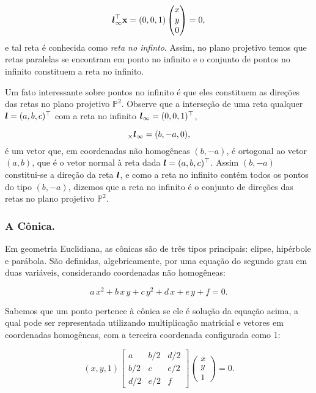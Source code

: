 \begin{equation*}
\boldsymbol{l}_\infty^\top \mathbf{x}=(0,0,1)
\begin{pmatrix}
x\\
y\\
0
\end{pmatrix}
=0,
\end{equation*} 
e tal reta é conhecida como \textit{reta no infinto}. Assim, no plano projetivo temos que retas paralelas se encontram em ponto no infinito e o conjunto de pontos no infinito constituem a reta no infinito.

Um fato interessante sobre pontos no infinito é que eles constituem as direções das retas no plano projetivo $\mathbb{P}^2$. Observe que a interseção de uma reta qualquer $\boldsymbol{l}=(a,b,c)^\top$ com a reta no infinito $\boldsymbol{l}_\infty=(0,0,1)^\top$,

\begin{equation*}
[\lightrgb]_\times \lightrgb_\infty=(b,-a,0),
\end{equation*}
é um vetor que, em coordenadas não homogêneas $(b,-a)$, é ortogonal ao vetor $(a,b)$, que é o vetor normal à reta dada $\boldsymbol{l}=(a,b,c)^\top$. Assim $(b,-a)$ constitui-se a direção da reta $\boldsymbol{l}$, e como a reta no infinito contém todos os pontos do tipo $(b,-a)$, dizemos que a reta no infinito é o conjunto de direções das retas no plano projetivo $\mathbb{P}^2$.\\





\subsubsection{A Cônica.}\label{sec.definicao-conica}


Em geometria Euclidiana, as cônicas são de três tipos principais: elipse, hipérbole e parábola. São definidas, algebricamente, por uma equação do segundo grau em duas variáveis, considerando coordenadas não homogêneas:

\begin{equation*}
a\,x^2+b\,x\,y+c\,y^2+d\,x+e\,y+f=0.
\end{equation*}

Sabemos que um ponto pertence à cônica se ele é solução da equação acima, a qual pode ser representada utilizando multiplicação matricial e vetores em coordenadas homogêneas, com a terceira coordenada configurada como 1:

\begin{equation*}
(x,y,1) 
 \begin{bmatrix}
a & b/2 & d/2\\
b/2 & c & e/2\\
d/2 & e/2 & f
\end{bmatrix}
 \begin{pmatrix}
x\\
y\\
1
\end{pmatrix}
 = 0.
\end{equation*}

